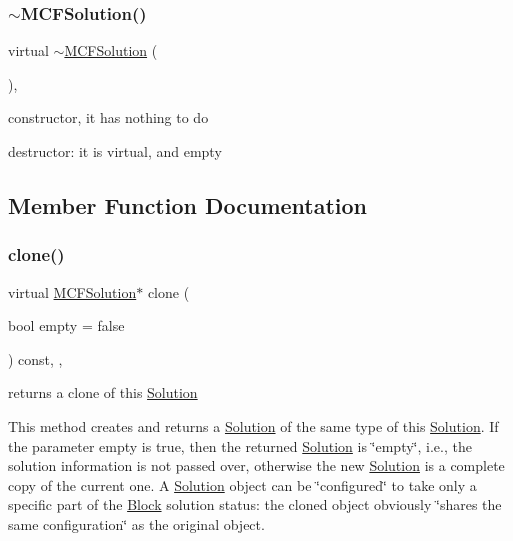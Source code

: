 \subsubsection{\texorpdfstring{$\sim$\+M\+C\+F\+Solution()}{~MCFSolution()}}
{\footnotesize\ttfamily virtual $\sim$\mbox{\hyperlink{class_s_m_spp__di__unipi__it_1_1_m_c_f_solution}{M\+C\+F\+Solution}} (\begin{DoxyParamCaption}{ }\end{DoxyParamCaption})\hspace{0.3cm}{\ttfamily [inline]}, {\ttfamily [virtual]}}



constructor, it has nothing to do 

destructor\+: it is virtual, and empty 

\subsection{Member Function Documentation}
\mbox{\label{class_s_m_spp__di__unipi__it_1_1_m_c_f_solution_a0bf2bed8ce0c86fbf2a3c7a312d3462a}} 
\subsubsection{\texorpdfstring{clone()}{clone()}}
{\footnotesize\ttfamily virtual \mbox{\hyperlink{class_s_m_spp__di__unipi__it_1_1_m_c_f_solution}{M\+C\+F\+Solution}}$\ast$ clone (\begin{DoxyParamCaption}\item[{bool}]{empty = {\ttfamily false} }\end{DoxyParamCaption}) const\hspace{0.3cm}{\ttfamily [final]}, {\ttfamily [override]}, {\ttfamily [virtual]}}



returns a clone of this \mbox{\hyperlink{class_s_m_spp__di__unipi__it_1_1_solution}{Solution}} 

This method creates and returns a \mbox{\hyperlink{class_s_m_spp__di__unipi__it_1_1_solution}{Solution}} of the same type of this \mbox{\hyperlink{class_s_m_spp__di__unipi__it_1_1_solution}{Solution}}. If the parameter empty is true, then the returned \mbox{\hyperlink{class_s_m_spp__di__unipi__it_1_1_solution}{Solution}} is \char`\"{}empty\char`\"{}, i.\+e., the solution information is not passed over, otherwise the new \mbox{\hyperlink{class_s_m_spp__di__unipi__it_1_1_solution}{Solution}} is a complete copy of the current one. A \mbox{\hyperlink{class_s_m_spp__di__unipi__it_1_1_solution}{Solution}} object can be \char`\"{}configured\char`\"{} to take only a specific part of the \mbox{\hyperlink{class_s_m_spp__di__unipi__it_1_1_block}{Block}} solution status\+: the cloned object obviously \char`\"{}shares the same configuration\char`\"{} as the original object.

